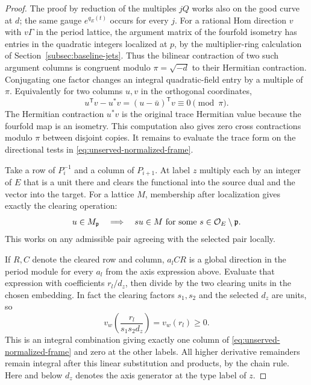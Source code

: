 \begin{proof}
The proof by reduction of the multiples \(jQ\) works also on the good curve at \(d\); the same gauge \(e^{q_E(t)}\) occurs for every \(j\). For a rational Hom direction
\(v\) with \(v\Gamma\) in the period lattice, the argument matrix
of the fourfold isometry has entries in the quadratic integers
localized at \(p\), by the multiplier-ring calculation of
Section~\ref{subsec:baseline-jets}. Thus the bilinear contraction
of two such argument columns is congruent modulo
\(\pi=\sqrt{-d}\) to their Hermitian contraction. Conjugating
one factor changes an integral quadratic-field entry by a
multiple of \(\pi\). Equivalently for two columns \(u,v\) in the orthogonal
coordinates,
\[
       u^{\mathsf T}v-u^*v=(u-\bar u)^{\mathsf T}v
                                 \equiv0\pmod{\pi}.
\]
The Hermitian contraction \(u^*v\) is the original trace
Hermitian value because the fourfold map is an isometry.
This computation also gives zero cross contractions modulo
\(\pi\) between disjoint copies. It remains to evaluate the
trace form on the directional tests in
\eqref{eq:unserved-normalized-frame}.


Take a row of \(P_i^{-1}\) and a column of \(P_{i+1}\).
At label \(z\) multiply each by an integer of \(E\) that is
a unit there and clears the functional into the source dual
and the vector into the target. For a lattice \(M\), membership after localization gives exactly the clearing operation:
\[
  u\in M_{\mathfrak p}\quad\Longrightarrow\quad su\in M\text{ for some }s\in{\cal O}_E\setminus\mathfrak p.
\]
 This works on
any admissible pair agreeing with the selected pair locally.

If \(R,C\) denote the cleared row and column, \(a_l C R\) is a
global direction in the period module for every \(a_l\) from the
axis expression above. Evaluate that expression with coefficients
\(r_l/d_z\), then divide by the two clearing units in the
chosen embedding.
In fact the clearing factors \(s_1,s_2\) and the selected \(d_z\) are units, so
\[
  v_w\!\left(\frac{r_l}{s_1s_2d_z}\right)=v_w(r_l)\ge0 .
\]
 This is an integral combination giving exactly
one column of \eqref{eq:unserved-normalized-frame} and zero at
the other labels. All higher derivative remainders remain
integral after this linear substitution and products, by the
chain rule. Here and below \(d_z\) denotes the axis generator
at the type label of \(z\).


\end{proof}
